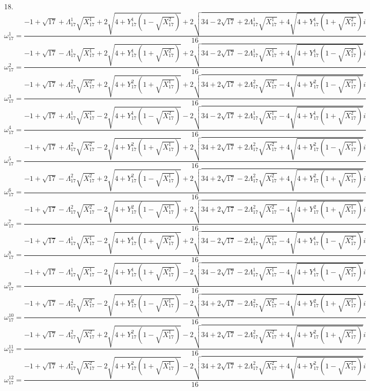 \documentclass{article}
\begin{document}
18.
\[ \omega_{17}^{1}=\frac{-1+\sqrt{17}+\Lambda_{17}^{1}\sqrt{X_{17}^{1}}+2\sqrt{4+Y_{17}^{1}(1-\sqrt{X_{17}^{2}})}+2\sqrt{34-2\sqrt{17}+2\Lambda_{17}^{1}\sqrt{X_{17}^{1}}+4\sqrt{4+Y_{17}^{1}(1+\sqrt{X_{17}^{2}})}}i}{16} \]
\[ \omega_{17}^{2}=\frac{-1+\sqrt{17}-\Lambda_{17}^{1}\sqrt{X_{17}^{1}}+2\sqrt{4+Y_{17}^{1}(1+\sqrt{X_{17}^{2}})}+2\sqrt{34-2\sqrt{17}-2\Lambda_{17}^{1}\sqrt{X_{17}^{1}}+4\sqrt{4+Y_{17}^{1}(1-\sqrt{X_{17}^{2}})}}i}{16} \]
\[ \omega_{17}^{3}=\frac{-1+\sqrt{17}+\Lambda_{17}^{2}\sqrt{X_{17}^{2}}+2\sqrt{4+Y_{17}^{2}(1+\sqrt{X_{17}^{1}})}+2\sqrt{34+2\sqrt{17}+2\Lambda_{17}^{2}\sqrt{X_{17}^{2}}-4\sqrt{4+Y_{17}^{2}(1-\sqrt{X_{17}^{1}})}}i}{16} \]
\[ \omega_{17}^{4}=\frac{-1+\sqrt{17}+\Lambda_{17}^{1}\sqrt{X_{17}^{1}}-2\sqrt{4+Y_{17}^{1}(1-\sqrt{X_{17}^{2}})}-2\sqrt{34-2\sqrt{17}+2\Lambda_{17}^{1}\sqrt{X_{17}^{1}}-4\sqrt{4+Y_{17}^{1}(1+\sqrt{X_{17}^{2}})}}i}{16} \]
\[ \omega_{17}^{5}=\frac{-1+\sqrt{17}+\Lambda_{17}^{2}\sqrt{X_{17}^{2}}-2\sqrt{4+Y_{17}^{2}(1+\sqrt{X_{17}^{1}})}+2\sqrt{34+2\sqrt{17}+2\Lambda_{17}^{2}\sqrt{X_{17}^{2}}+4\sqrt{4+Y_{17}^{2}(1-\sqrt{X_{17}^{1}})}}i}{16} \]
\[ \omega_{17}^{6}=\frac{-1+\sqrt{17}-\Lambda_{17}^{2}\sqrt{X_{17}^{2}}+2\sqrt{4+Y_{17}^{2}(1-\sqrt{X_{17}^{1}})}+2\sqrt{34+2\sqrt{17}-2\Lambda_{17}^{2}\sqrt{X_{17}^{2}}+4\sqrt{4+Y_{17}^{2}(1+\sqrt{X_{17}^{1}})}}i}{16} \]
\[ \omega_{17}^{7}=\frac{-1+\sqrt{17}-\Lambda_{17}^{2}\sqrt{X_{17}^{2}}-2\sqrt{4+Y_{17}^{2}(1-\sqrt{X_{17}^{1}})}+2\sqrt{34+2\sqrt{17}-2\Lambda_{17}^{2}\sqrt{X_{17}^{2}}-4\sqrt{4+Y_{17}^{2}(1+\sqrt{X_{17}^{1}})}}i}{16} \]
\[ \omega_{17}^{8}=\frac{-1+\sqrt{17}-\Lambda_{17}^{1}\sqrt{X_{17}^{1}}-2\sqrt{4+Y_{17}^{1}(1+\sqrt{X_{17}^{2}})}+2\sqrt{34-2\sqrt{17}-2\Lambda_{17}^{1}\sqrt{X_{17}^{1}}-4\sqrt{4+Y_{17}^{1}(1-\sqrt{X_{17}^{2}})}}i}{16} \]
\[ \omega_{17}^{9}=\frac{-1+\sqrt{17}-\Lambda_{17}^{1}\sqrt{X_{17}^{1}}-2\sqrt{4+Y_{17}^{1}(1+\sqrt{X_{17}^{2}})}-2\sqrt{34-2\sqrt{17}-2\Lambda_{17}^{1}\sqrt{X_{17}^{1}}-4\sqrt{4+Y_{17}^{1}(1-\sqrt{X_{17}^{2}})}}i}{16} \]
\[ \omega_{17}^{10}=\frac{-1+\sqrt{17}-\Lambda_{17}^{2}\sqrt{X_{17}^{2}}-2\sqrt{4+Y_{17}^{2}(1-\sqrt{X_{17}^{1}})}-2\sqrt{34+2\sqrt{17}-2\Lambda_{17}^{2}\sqrt{X_{17}^{2}}-4\sqrt{4+Y_{17}^{2}(1+\sqrt{X_{17}^{1}})}}i}{16} \]
\[ \omega_{17}^{11}=\frac{-1+\sqrt{17}-\Lambda_{17}^{2}\sqrt{X_{17}^{2}}+2\sqrt{4+Y_{17}^{2}(1-\sqrt{X_{17}^{1}})}-2\sqrt{34+2\sqrt{17}-2\Lambda_{17}^{2}\sqrt{X_{17}^{2}}+4\sqrt{4+Y_{17}^{2}(1+\sqrt{X_{17}^{1}})}}i}{16} \]
\[ \omega_{17}^{12}=\frac{-1+\sqrt{17}+\Lambda_{17}^{2}\sqrt{X_{17}^{2}}-2\sqrt{4+Y_{17}^{2}(1+\sqrt{X_{17}^{1}})}-2\sqrt{34+2\sqrt{17}+2\Lambda_{17}^{2}\sqrt{X_{17}^{2}}+4\sqrt{4+Y_{17}^{2}(1-\sqrt{X_{17}^{1}})}}i}{16} \]
\end{document}
